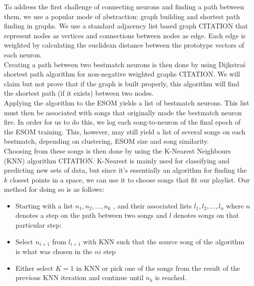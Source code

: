 To address the first challenge of connecting neurons and finding a path between them, we use a popular mode of abstraction: graph building and shortest path finding in graphs. We use a standard adjacency list based graph CITATION that represent nodes as vertices and connections between nodes as edge. Each edge is weighted by calculating the euclidean distance between the prototype vectors of each neuron. \\
Creating a path between two bestmatch neurons is then done by using Dijkstra\'s shortest path algorithm for non-negative weighted graphs CITATION. We will claim but not prove that if the graph is built properly, this algorithm will find the shortest path (if it exists) between two nodes. \\

Applying the algorithm to the ESOM yields a list of bestmatch neurons. This list must then be associated with songs that originally made the bestmatch neuron fire. In order for us to do this, we log each song-to-neuron of the final epoch of the ESOM training. This, however, may still yield a list of several songs on each bestmatch, depending on clustering, ESOM size and song similarity. \\
Choosing from these songs is then done by using the K-Nearest Neighbours (KNN) algorithm CITATION. K-Nearest is mainly used for classifying and predicting new sets of data, but since it's essentially an algorithm for finding the $k$ closest points in a space, we can use it to choose songs that fit our playlist. Our method for doing so is as follows:

\begin{itemize}
\item Starting with a list $ n_1, n_2, \dots, n_k $ , and their associated lists $ l_1, l_2, \dots, l_n $ where $n$ denotes a step on the path between two songs and $l$ denotes songs on that particular step: \\
\item Select $ n_{i+1} $ from $ l_{i+1} $ with KNN such that the source song of the algorithm is what was chosen in the $ n{i} $ step \\
\item Either select $K = 1$ in KNN or pick one of the songs from the result of the previous KNN iteration and continue until $n_k$ is reached.\\
\end{itemize}

